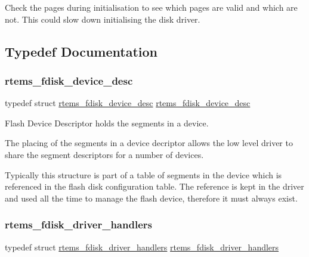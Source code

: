Check the pages during initialisation to see which pages are valid and which are not. This could slow down initialising the disk driver. 

\subsection{Typedef Documentation}
\mbox{\label{group__RTEMSFDisk_ga4e1cf210089a66216e739c7ccd3ea84e}} 
\subsubsection{\texorpdfstring{rtems\_fdisk\_device\_desc}{rtems\_fdisk\_device\_desc}}
{\footnotesize\ttfamily typedef struct \mbox{\hyperlink{structrtems__fdisk__device__desc}{rtems\+\_\+fdisk\+\_\+device\+\_\+desc}}  \mbox{\hyperlink{structrtems__fdisk__device__desc}{rtems\+\_\+fdisk\+\_\+device\+\_\+desc}}}



Flash Device Descriptor holds the segments in a device. 

The placing of the segments in a device decriptor allows the low level driver to share the segment descriptors for a number of devices.

Typically this structure is part of a table of segments in the device which is referenced in the flash disk configuration table. The reference is kept in the driver and used all the time to manage the flash device, therefore it must always exist. \mbox{\label{group__RTEMSFDisk_ga3e36a0fb2b70165104f1d988f33cd029}} 
\subsubsection{\texorpdfstring{rtems\_fdisk\_driver\_handlers}{rtems\_fdisk\_driver\_handlers}}
{\footnotesize\ttfamily typedef struct \mbox{\hyperlink{structrtems__fdisk__driver__handlers}{rtems\+\_\+fdisk\+\_\+driver\+\_\+handlers}}  \mbox{\hyperlink{structrtems__fdisk__driver__handlers}{rtems\+\_\+fdisk\+\_\+driver\+\_\+handlers}}}



